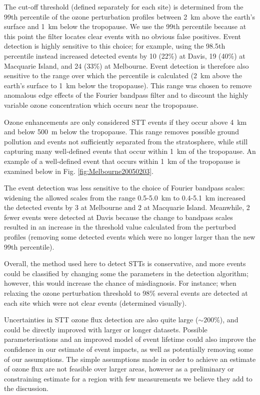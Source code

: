 \documentclass[acp, manuscript]{copernicus} %
\begin{document}
  The cut-off threshold (defined separately for each site) is determined from the 99th percentile of the ozone perturbation profiles between 2~km above the earth's surface and 1~km below the tropopause.
  We use the 99th percentile because at this point the filter locates clear events with no obvious false positives.
  Event detection is highly sensitive to this choice; for example, using the 98.5th percentile instead increased detected events by 10 (22\%) at Davis, 19 (40\%) at Macquarie Island, and 24 (33\%) at Melbourne.
  Event detection is therefore also sensitive to the range over which the percentile is calculated (2~km above the earth's surface to 1~km below the tropopause).
  This range was chosen to remove anomalous edge effects of the Fourier bandpass filter and to discount the highly variable ozone concentration which occurs near the tropopause.
  
  Ozone enhancements are only considered STT events if they occur above 4~km and below 500~m below the tropopause.
  This range removes possible ground pollution and events not sufficiently separated from the stratosphere, while still capturing many well-defined events that occur within 1~km of the tropopause.
  An example of a well-defined event that occurs within 1~km of the tropopause is examined below in Fig. \ref{fig:Melbourne20050203}.
  
  The event detection was less sensitive to the choice of Fourier bandpass scales: widening the allowed scales from the range 0.5-5.0~km to 0.4-5.1~km increased the detected events by 3 at Melbourne and 2 at Macquarie Island. Meanwhile, 2 fewer events were detected at Davis because the change to bandpass scales resulted in an increase in the threshold value calculated from the perturbed profiles (removing some detected events which were no longer larger than the new 99th percentile).
  
  Overall, the method used here to detect STTs is conservative, and more events could be classified by changing some the parameters in the detection algorithm; however, this would increase the chance of misdiagnosis. 
  For instance; when relaxing the ozone perturbation threshold to 98\% several events are detected at each site which were not clear events (determined visually).
  
  Uncertainties in STT ozone flux detection are also quite large ($\sim 200\%$), and could be directly improved with larger or longer datasets.
  Possible parameterisations and an improved model of event lifetime could also improve the confidence in our estimate of event impacts, as well as potentially removing some of our assumptions.
  The simple assumptions made in order to achieve an estimate of ozone flux are not feasible over larger areas, however as a preliminary or constraining estimate for a region with few measurements we believe they add to the discussion.
  
\end{document}

